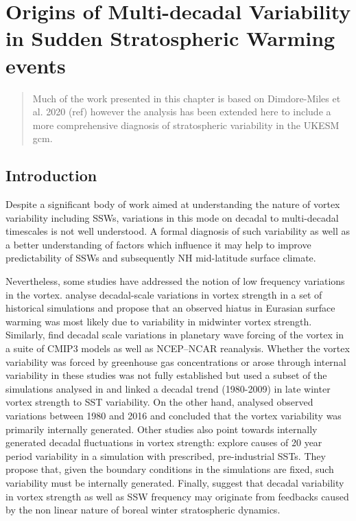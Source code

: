 \chapter{Origins of Multi-decadal Variability in Sudden Stratospheric Warming events}
\label{cha:models}
\begin{quotation}
  Much of the work presented in this chapter is based on Dimdore-Miles et al. 2020 (ref) however the analysis has been extended here to include a more comprehensive diagnosis of stratospheric variability in the UKESM gcm.
\end{quotation}


\section{Introduction}
\label{sec:origins_introduction}
Despite a significant body of work aimed at understanding the nature of vortex variability including SSWs, variations in this mode on decadal to multi-decadal timescales is not well understood. A formal diagnosis of such variability as well as a better understanding of factors which influence it may help to improve predictability of SSWs and subsequently NH mid-latitude surface climate.

Nevertheless, some studies have addressed the notion of low frequency variations in the vortex. \cite{Garfinkel2017} analyse decadal-scale variations in vortex strength in a set of historical simulations and propose that an observed hiatus in Eurasian surface warming was most likely due to variability in midwinter vortex strength. Similarly, \cite{cohen2009} find decadal scale variations in planetary wave forcing of the vortex in a suite of CMIP3 models as well as NCEP–NCAR reanalysis. Whether the vortex variability was forced by greenhouse gas concentrations or arose through internal variability in these studies was not fully established but \cite{Garfinkel2015} used a subset of the simulations analysed in \cite{Garfinkel2017} and linked a decadal trend (1980-2009) in late winter vortex strength to SST variability. On the other hand, \cite{Seviour2017} analysed observed variations between 1980 and 2016 and concluded that the vortex variability was primarily internally generated. Other studies also point towards internally generated decadal fluctuations in vortex strength: \cite{Manzini2012} explore causes of 20 year period variability in a simulation with prescribed, pre-industrial SSTs. They propose that, given the boundary conditions in the simulations are fixed, such variability must be internally generated. Finally, \cite{Butchart2000} suggest that decadal variability in vortex strength as well as SSW frequency may originate from feedbacks caused by the non linear nature of boreal winter stratospheric dynamics.

